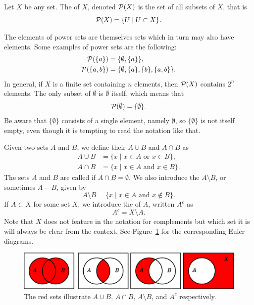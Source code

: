 \begin{defn}
  Let $X$ be any set. The  of $X$, denoted $\mathcal{P}(X)$ is the set of all subsets of $X$, that is
  \[
    \mathcal{P}(X) = \{U \mid U \subset X \}.
  \]
\end{defn}
\begin{example}
  The elements of power sets are themselves sets which in turn may also have elements. Some examples of power sets are the following:
  \begin{align*}
    \mathcal{P}(\{a\}) &= \{ \emptyset, \{a \} \}, \\
    \mathcal{P}(\{a,b\}) &= \{ \emptyset, \{a\}, \{b\} , \{a,b\} \}.
  \end{align*}
  In general, if $X$ is a finite set containing $n$ elements, then $\mathcal{P}(X)$ contains $2^n$ elements. The only subset of $\emptyset$ is $\emptyset$ itself, which means that
  \[
    \mathcal{P}(\emptyset) = \{\emptyset\}.
  \]
  Be aware that $\{ \emptyset \}$ consists of a single element, namely $\emptyset$, so $\{\emptyset\}$ is not itself empty, even though it is tempting to read the notation like that.
\end{example}
\begin{defn}
  Given two sets $A$ and $B$, we define their  $A \cup B$ and  $A \cap B$ as
  \begin{align*}
    A \cup B &= \{ x \mid \text{$x \in A$ or $x \in B$} \}, \\
    A \cap B &= \{ x \mid \text{$x \in A$ and $x \in B$} \}.
  \end{align*}
  The sets $A$ and $B$ are called  if $A \cap B = \emptyset$. We also introduce the  $A \setminus B$, or sometimes $A - B$, given by
  \[
    A \setminus B = \{ x \mid \text{$x \in A$ and $x \notin B$} \}.
  \]
  If $A \subset X$ for some set $X$, we introduce the  of $A$, written $A^c$ as
  \[
    A^c = X \setminus A.
  \]
  Note that $X$ does not feature in the notation for complements but which set it is will always be clear from the context. See Figure~\ref{union-intersection} for the corresponding Euler diagrams.
\end{defn}
\begin{figure}
  \centering
  \includegraphics[scale=0.3]{images/union-intersection.pdf}
  \caption{The red sets illustrate $A \cup B$, $A \cap B$, $A \setminus B$, and $A^c$ respectively.}
  \label{union-intersection}
\end{figure}

